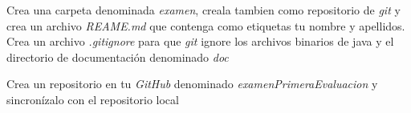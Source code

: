 \documentclass[addpoints,12pt]{exam}
\begin{document}
\begin{center}
\end{center}
\vspace{0.1in}
Crea una carpeta denominada \emph{examen}, creala tambien como repositorio de \emph{git} y crea un archivo \emph{REAME.md} que contenga como etiquetas tu nombre y apellidos. Crea un archivo \emph{.gitignore} para que \textit{git} ignore los archivos binarios de java y el directorio de documentación denominado \textit{doc}\par 
Crea un repositorio en tu \textit{GitHub} denominado \emph{examenPrimeraEvaluacion} y sincronízalo con el repositorio local
\end{document}
